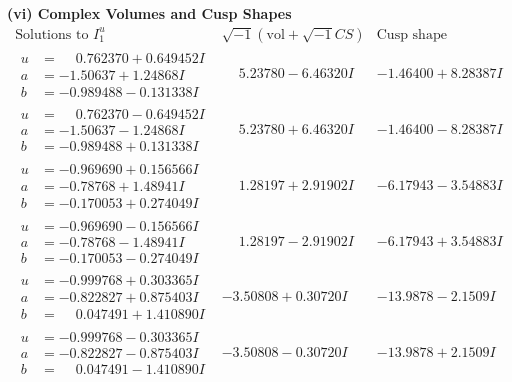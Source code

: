 \documentclass[1p]{elsarticle_modified}
\theoremstyle{definition}
\newcommand{\I}{\sqrt{-1}}
\begin{document}
\newpage\flushleft \textbf{(vi) Complex Volumes and Cusp Shapes}
$$\begin{array}{c|c|c}  
\text{Solutions to }I^u_{1}& \I (\text{vol} + \sqrt{-1}CS) & \text{Cusp shape}\\
 \hline 
\begin{aligned}
u &= \phantom{-}0.762370 + 0.649452 I \\
a &= -1.50637 + 1.24868 I \\
b &= -0.989488 - 0.131338 I\end{aligned}
 & \phantom{-}5.23780 - 6.46320 I & -1.46400 + 8.28387 I \\ \hline\begin{aligned}
u &= \phantom{-}0.762370 - 0.649452 I \\
a &= -1.50637 - 1.24868 I \\
b &= -0.989488 + 0.131338 I\end{aligned}
 & \phantom{-}5.23780 + 6.46320 I & -1.46400 - 8.28387 I \\ \hline\begin{aligned}
u &= -0.969690 + 0.156566 I \\
a &= -0.78768 + 1.48941 I \\
b &= -0.170053 + 0.274049 I\end{aligned}
 & \phantom{-}1.28197 + 2.91902 I & -6.17943 - 3.54883 I \\ \hline\begin{aligned}
u &= -0.969690 - 0.156566 I \\
a &= -0.78768 - 1.48941 I \\
b &= -0.170053 - 0.274049 I\end{aligned}
 & \phantom{-}1.28197 - 2.91902 I & -6.17943 + 3.54883 I \\ \hline\begin{aligned}
u &= -0.999768 + 0.303365 I \\
a &= -0.822827 + 0.875403 I \\
b &= \phantom{-}0.047491 + 1.410890 I\end{aligned}
 & -3.50808 + 0.30720 I & -13.9878 - 2.1509 I \\ \hline\begin{aligned}
u &= -0.999768 - 0.303365 I \\
a &= -0.822827 - 0.875403 I \\
b &= \phantom{-}0.047491 - 1.410890 I\end{aligned}
 & -3.50808 - 0.30720 I & -13.9878 + 2.1509 I \\ \hline\begin{aligned}

\end{aligned}
\end{array}$$
\end{document}

